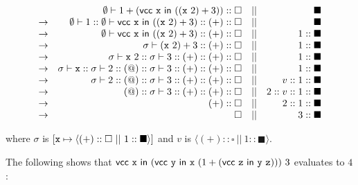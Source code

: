 \[
\begin{array}{lrcr}
& \emptyset\vdash 1+(\textsf{vcc}\ \cx\ \textsf{in}\ ((\cx\ 2)+3))::\square &||&
\blacksquare \\
\rightarrow & \emptyset\vdash 1::\emptyset\vdash \textsf{vcc}\ \cx\ \textsf{in}\
((\cx\ 2)+3)::(+)::\square &||& \blacksquare \\
\rightarrow & \emptyset\vdash \textsf{vcc}\ \cx\ \textsf{in}\ ((\cx\
2)+3)::(+)::\square &||& 1::\blacksquare \\
\rightarrow & \sigma\vdash (\cx\ 2)+3::(+)::\square &||& 1::\blacksquare \\
\rightarrow & \sigma\vdash \cx\ 2::\sigma\vdash 3::(+)::(+)::\square &||&
1::\blacksquare \\
\rightarrow & \sigma\vdash \cx::\sigma\vdash 2::(@)::\sigma\vdash
3::(+)::(+)::\square &||& 1::\blacksquare \\
\rightarrow & \sigma\vdash 2::(@)::\sigma\vdash 3::(+)::(+)::\square &||&
v:: 1::\blacksquare \\
\rightarrow & (@)::\sigma\vdash 3::(+)::(+)::\square &||& 2::v::1::\blacksquare \\
\rightarrow & (+)::\square &||& 2::1::\blacksquare \\
\rightarrow & \square &||& 3::\blacksquare \\
\end{array}
\]

where $\sigma$ is $\lbrack \texttt{x}\mapsto\langle(+)::\square\ ||\
1::\blacksquare\rangle\rbrack$ and $v$ is
$\langle(+)::\square \ ||\  1::\blacksquare\rangle$.

The following shows that
$\textsf{vcc}\ \texttt{x}\ \textsf{in}\ (\textsf{vcc}\ \texttt{y}\ \textsf{in}\ \texttt{x}\ (1+(\textsf{vcc}\ \texttt{z}\ \textsf{in}\ \texttt{y}\ \texttt{z})))\ 3$
evaluates to $4$:

